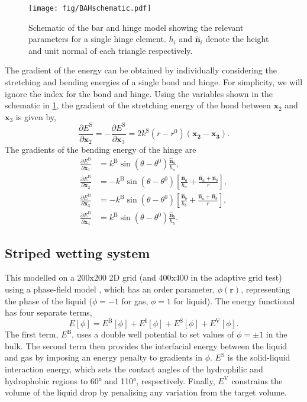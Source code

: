 \documentclass[aip,jcp,11pt]{revtex4-2}
\begin{document}
\begin{figure}[htb]
  \texttt{[image: fig/BAHschematic.pdf]}
  \caption{\label{fig:BAHschematic}
    Schematic of the bar and hinge model showing the relevant parameters for a single hinge element.
    $h_i$ and $\bm{\hat{n}}_i$ denote the height and unit normal of each triangle respectively.
  }
\end{figure}
The gradient of the energy can be obtained by individually considering the stretching and bending energies of a single bond and hinge.
For simplicity, we will ignore the index for the bond and hinge.
Using the variables shown in the schematic in \cref{fig:BAHschematic}, the gradient of the stretching energy of the bond between $\bm{x}_2$ and $\bm{x}_3$ is given by,
\begin{equation}
  \frac{\partial E^\mathrm{S}}{\partial \bm{x}_2} = - \frac{\partial E^\mathrm{S}}{\partial \bm{x}_3} =
    2 k^\mathrm{S} (r - r^0) (\bm{x_2} - \bm{x_3}).
\end{equation}
The gradients of the bending energy of the hinge are
\begin{align}
  \frac{\partial E^\mathrm{B}}{\partial \bm{x}_1} &= k^\mathrm{B} \sin(\theta - \theta^0) \frac{\bm{\hat{n}}_a}{h_a}, \\
  \frac{\partial E^\mathrm{B}}{\partial \bm{x}_2} &= - k^\mathrm{B} \sin(\theta - \theta^0) \left[\frac{\bm{\hat{n}}_a}{h_a} + \frac{\bm{\hat{n}}_a + \bm{\hat{n}}_b}{r}\right], \\
  \frac{\partial E^\mathrm{B}}{\partial \bm{x}_3} &= - k^\mathrm{B} \sin(\theta - \theta^0) \left[\frac{\bm{\hat{n}}_b}{h_b} + \frac{\bm{\hat{n}}_a + \bm{\hat{n}}_b}{r}\right], \\
  \frac{\partial E^\mathrm{B}}{\partial \bm{x}_4} &= k^\mathrm{B} \sin(\theta - \theta^0) \frac{\bm{\hat{n}}_b}{h_b}.
\end{align}

\subsection{Striped wetting system}
This modelled on a 200x200 2D grid (and 400x400 in the adaptive grid test) using a phase-field model \cite{Panter2019b}, which has an order parameter, $\phi(\bm{r})$, representing the phase of the liquid ($\phi=-1$ for gas, $\phi=1$ for liquid).
The energy functional has four separate terms,
\begin{equation} \label{eq:phasefield}
  E[\phi] = E^\mathrm{B}[\phi] + E^\mathrm{I}[\phi] + E^\mathrm{S}[\phi] + E^\mathrm{V}[\phi].
\end{equation}
The first term, $E^\mathrm{B}$, uses a double well potential to set values of $\phi=\pm1$ in the bulk.
The second term then provides the interfacial energy between the liquid and gas by imposing an energy penalty to gradients in $\phi$.
$E^\mathrm{S}$ is the solid-liquid interaction energy, which sets the contact angles of the hydrophilic and hydrophobic regions to 60\si{\degree} and 110\si{\degree}, respectively.
Finally, $E^\mathrm{V}$ constrains the volume of the liquid drop by penalising any variation from the target volume.
\end{document}
